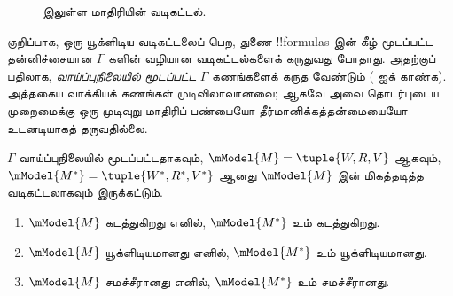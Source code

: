 \documentclass[../../../include/open-logic-section]{subfiles}
\begin{document}
\begin{figure}[ht]
  \centering
  \caption{ இலுள்ள மாதிரியின் வடிகட்டல்.}
\end{figure}

குறிப்பாக, ஒரு யூக்ளிடிய வடிகட்டலைப் பெற, துணை-!!{formula}s இன் கீழ்
மூடப்பட்ட தன்னிச்சையான $\Gamma$ களின் வழியான வடிகட்டல்களைக் கருதுவது
போதாது. அதற்குப் பதிலாக, \emph{வாய்ப்புநிலையில் மூடப்பட்ட}
$\Gamma$ கணங்களைக் கருத வேண்டும்
( ஐக் காண்க). அத்தகைய வாக்கியக் கணங்கள்
முடிவிலாவானவை; ஆகவே அவை தொடர்புடைய முறைமைக்கு ஒரு முடிவுறு மாதிரிப்
பண்பையோ தீர்மானிக்கத்தன்மையையோ உடனடியாகத் தருவதில்லை.

\begin{thm}
  $\Gamma$ வாய்ப்புநிலையில் மூடப்பட்டதாகவும்,
  $\mModel{M}=\tuple{W,R,V}$ ஆகவும்,
  $\mModel{M^*} = \tuple{W^*,R^*,V^*}$ ஆனது $\mModel{M}$ இன் மிகத்தடித்த
  வடிகட்டலாகவும் இருக்கட்டும்.
  \begin{enumerate}
  \item $\mModel{M}$ கடத்துகிறது எனில், $\mModel{M^*}$ உம் கடத்துகிறது.
  \item $\mModel{M}$ யூக்ளிடியமானது எனில், $\mModel{M^*}$ உம் யூக்ளிடியமானது.
  \item $\mModel{M}$ சமச்சீரானது எனில், $\mModel{M^*}$ உம் சமச்சீரானது.
  \end{enumerate}
\end{thm}
\end{document}
